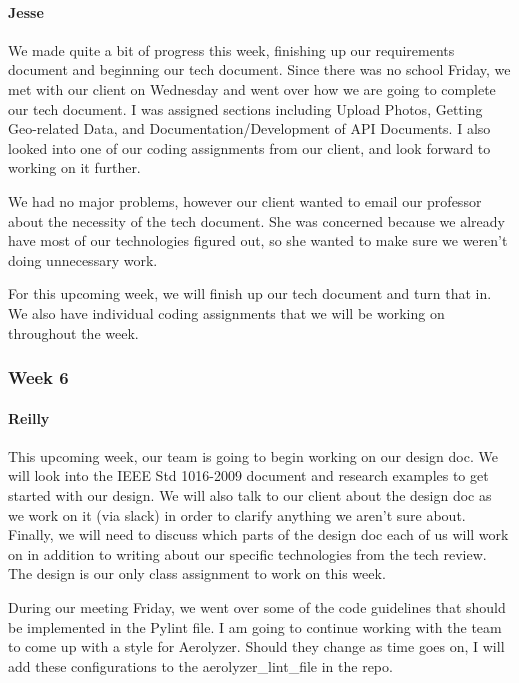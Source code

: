 \documentclass[onecolumn, draftclsnofoot,10pt, compsoc]{IEEEtran}
\begin{document}
\begin{flushleft}
\paragraph{Jesse}
 
We made quite a bit of progress this week, finishing up our requirements document and beginning our tech document. Since there was no school Friday, we met with our client on Wednesday and went over how we are going to complete our tech document. I was assigned sections including Upload Photos, Getting Geo-related Data, and Documentation/Development of API Documents. I also looked into one of our coding assignments from our client, and look forward to working on it further.
 
 
We had no major problems, however our client wanted to email our professor about the necessity of the tech document. She was concerned because we already have most of our technologies figured out, so she wanted to make sure we weren't doing unnecessary work.
 
 
For this upcoming week, we will finish up our tech document and turn that in. We also have individual coding assignments that we will be working on throughout the week.
 
\subsubsection{Week 6}
\paragraph{Reilly}
 
This upcoming week, our team is going to begin working on our design doc. We will look into the IEEE Std 1016-2009 document and research examples to get started with our design. We will also talk to our client about the design doc as we work on it (via slack) in order to clarify anything we aren't sure about. Finally, we will need to discuss which parts of the design doc each of us will work on in addition to writing about our specific technologies from the tech review. The design is our only class assignment to work on this week.
 
During our meeting Friday, we went over some of the code guidelines that should be implemented in the Pylint file. I am going to continue working with the team to come up with a style for Aerolyzer. Should they change as time goes on, I will add these configurations to the aerolyzer\_lint\_file in the repo.
 

\end{flushleft}
\end{document}
